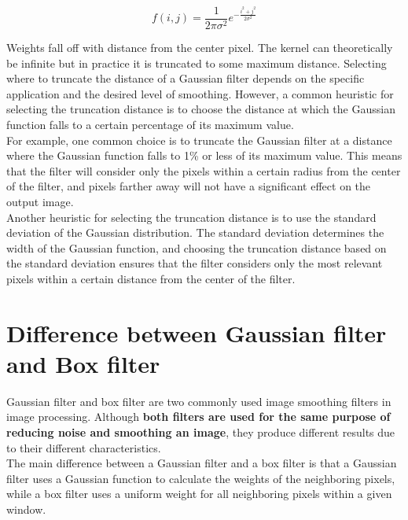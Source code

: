 \documentclass{article}
\begin{document}
\begingroup
\Large
\begin{equation*}
    f(i,j) = \frac{1}{2 \pi \sigma^2} e^{-\frac{i^2+j^2}{2 \sigma^2}}
\end{equation*}
\endgroup

Weights fall off with distance from the center pixel. The kernel can theoretically be infinite but in practice it is truncated to some maximum distance. Selecting where to truncate the distance of a Gaussian filter depends on the specific application and the desired level of smoothing. However, a common heuristic for selecting the truncation distance is to choose the distance at which the Gaussian function falls to a certain percentage of its maximum value. \\

For example, one common choice is to truncate the Gaussian filter at a distance where the Gaussian function falls to 1\% or less of its maximum value. This means that the filter will consider only the pixels within a certain radius from the center of the filter, and pixels farther away will not have a significant effect on the output image. \\

Another heuristic for selecting the truncation distance is to use the standard deviation of the Gaussian distribution. The standard deviation determines the width of the Gaussian function, and choosing the truncation distance based on the standard deviation ensures that the filter considers only the most relevant pixels within a certain distance from the center of the filter.

\section*{Difference between Gaussian filter and Box filter}

Gaussian filter and box filter are two commonly used image smoothing filters in image processing. Although \textbf{both filters are used for the same purpose of reducing noise and smoothing an image}, they produce different results due to their different characteristics. \\

The main difference between a Gaussian filter and a box filter is that a Gaussian filter uses a Gaussian function to calculate the weights of the neighboring pixels, while a box filter uses a uniform weight for all neighboring pixels within a given window. \\
\end{document}
